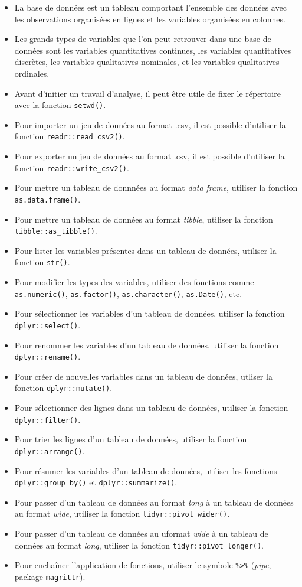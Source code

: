 \documentclass[
  french,
]{book}
\providecommand{\tightlist}{%
  \setlength{\itemsep}{0pt}\setlength{\parskip}{0pt}}
\begin{document}
\begin{itemize}
\tightlist
\item
  La base de données est un tableau comportant l'ensemble des données avec les observations organisées en lignes et les variables organisées en colonnes.
\item
  Les grands types de variables que l'on peut retrouver dans une base de données sont les variables quantitatives continues, les variables quantitatives discrètes, les variables qualitatives nominales, et les variables qualitatives ordinales.
\item
  Avant d'initier un travail d'analyse, il peut être utile de fixer le répertoire avec la fonction \texttt{setwd()}.
\item
  Pour importer un jeu de données au format .csv, il est possible d'utiliser la fonction \texttt{readr::read\_csv2()}.
\item
  Pour exporter un jeu de données au format .csv, il est possible d'utiliser la fonction \texttt{readr::write\_csv2()}.
\item
  Pour mettre un tableau de donnnées au format \emph{data frame}, utiliser la fonction \texttt{as.data.frame()}.
\item
  Pour mettre un tableau de données au format \emph{tibble}, utiliser la fonction \texttt{tibble::as\_tibble()}.
\item
  Pour lister les variables présentes dans un tableau de données, utiliser la fonction \texttt{str()}.
\item
  Pour modifier les types des variables, utiliser des fonctions comme \texttt{as.numeric()}, \texttt{as.factor()}, \texttt{as.character()}, \texttt{as.Date()}, etc.
\item
  Pour sélectionner les variables d'un tableau de données, utiliser la fonction \texttt{dplyr::select()}.
\item
  Pour renommer les variables d'un tableau de données, utiliser la fonction \texttt{dplyr::rename()}.
\item
  Pour créer de nouvelles variables dans un tableau de données, utliser la fonction \texttt{dplyr::mutate()}.
\item
  Pour sélectionner des lignes dans un tableau de données, utiliser la fonction \texttt{dplyr::filter()}.
\item
  Pour trier les lignes d'un tableau de données, utiliser la fonction \texttt{dplyr::arrange()}.
\item
  Pour résumer les variables d'un tableau de données, utiliser les fonctions \texttt{dplyr::group\_by()} et \texttt{dplyr::summarize()}.
\item
  Pour passer d'un tableau de données au format \emph{long} à un tableau de données au format \emph{wide}, utiliser la fonction \texttt{tidyr::pivot\_wider()}.
\item
  Pour passer d'un tableau de données au uformat \emph{wide} à un tableau de données au format \emph{long}, utiliser la fonction \texttt{tidyr::pivot\_longer()}.
\item
  Pour enchaîner l'application de fonctions, utiliser le symbole \texttt{\%\textgreater{}\%} (\emph{pipe}, package \texttt{magrittr}).
\end{itemize}
\end{document}
